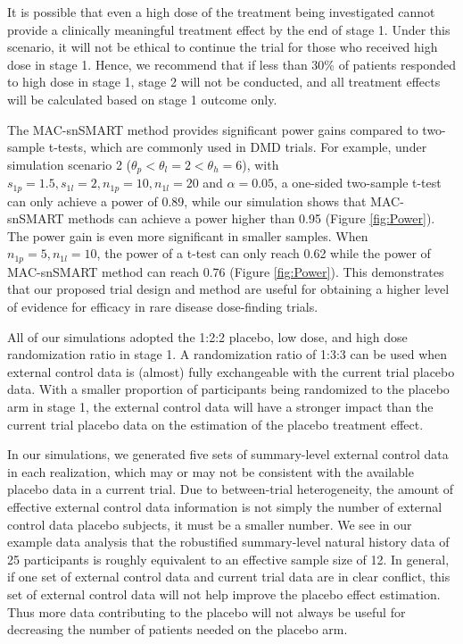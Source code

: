 It is possible that even a high dose of the treatment being investigated cannot provide a clinically meaningful treatment effect by the end of stage 1. Under this scenario, it will not be ethical to continue the trial for those who received high dose in stage 1. Hence, we recommend that if less than 30\% of patients responded to high dose in stage 1, stage 2 will not be conducted, and all treatment effects will be calculated based on stage 1 outcome only.

The \ac{MAC}-snSMART method provides significant power gains compared to two-sample t-tests, which are commonly used in \ac{DMD} trials. For example, under simulation scenario 2 ($\theta_p < \theta_l = 2 < \theta_h = 6$), with $s_{1p} = 1.5, s_{1l} = 2, n_{1p} = 10, n_{1l} = 20$ and $\alpha=0.05$, a one-sided two-sample t-test can only achieve a power of 0.89, while our simulation shows that \ac{MAC}-snSMART methods can achieve a power higher than 0.95 (Figure \ref{fig:Power}). The power gain is even more significant in smaller samples. When $n_{1p} = 5, n_{1l} = 10$, the power of a t-test can only reach 0.62 while the power of \ac{MAC}-snSMART method can reach 0.76 (Figure \ref{fig:Power}). This demonstrates that our proposed trial design and method are useful for obtaining a higher level of evidence for efficacy in rare disease dose-finding trials.

All of our simulations adopted the 1:2:2 placebo, low dose, and high dose randomization ratio in stage 1. A randomization ratio of 1:3:3 can be used when external control data is (almost) fully exchangeable with the current trial placebo data. With a smaller proportion of participants being randomized to the placebo arm in stage 1, the external control data will have a stronger impact than the current trial placebo data on the estimation of the placebo treatment effect. 

In our simulations, we generated five sets of summary-level external control data in each realization, which may or may not be consistent with the available placebo data in a current trial. Due to between-trial heterogeneity, the amount of effective external control data information is not simply the number of external control data placebo subjects, it must be a smaller number. We see in our example data analysis that the robustified summary-level natural history data of 25 participants is roughly equivalent to an effective sample size of 12. In general, if one set of external control data and current trial data are in clear conflict, this set of external control data will not help improve the placebo effect estimation. Thus more data contributing to the placebo will not always be useful for decreasing the number of patients needed on the placebo arm. 

